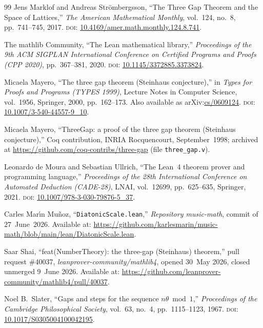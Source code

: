 \documentclass[11pt,reqno]{amsart}
\theoremstyle{plain}
\theoremstyle{definition}
\theoremstyle{remark}
\newcommand{\code}[1]{\texttt{#1}}
\begin{document}
\begin{thebibliography}{99}
Jens Marklof and Andreas Str\"{o}mbergsson,
``The Three Gap Theorem and the Space of Lattices,''
\emph{The American Mathematical Monthly}, vol.~124, no.~8, pp.~741--745,
2017.
\textsc{doi}: \href{https://doi.org/10.4169/amer.math.monthly.124.8.741}%
{10.4169/amer.math.monthly.124.8.741}.

The mathlib Community,
``The Lean mathematical library,''
\emph{Proceedings of the 9th ACM SIGPLAN International Conference on
Certified Programs and Proofs (CPP 2020)},
pp.~367--381, 2020.
\textsc{doi}: \href{https://doi.org/10.1145/3372885.3373824}%
{10.1145/3372885.3373824}.

Micaela Mayero,
``The three gap theorem (Steinhaus conjecture),''
in \emph{Types for Proofs and Programs (TYPES 1999)},
Lecture Notes in Computer Science, vol.~1956, Springer, 2000, pp.~162--173.
Also available as arXiv:\href{https://arxiv.org/abs/cs/0609124}{cs/0609124}.
\textsc{doi}: \href{https://doi.org/10.1007/3-540-44557-9_10}%
{10.1007/3-540-44557-9\_10}.

Micaela Mayero,
``ThreeGap: a proof of the three gap theorem (Steinhaus conjecture),''
Coq contribution, INRIA Rocquencourt, September~1998; archived at
\url{https://github.com/coq-contribs/three-gap} (file \code{three\_gap.v}).

Leonardo de Moura and Sebastian Ullrich,
``The Lean~4 theorem prover and programming language,''
\emph{Proceedings of the 28th International Conference on Automated
Deduction (CADE-28)},
LNAI, vol.~12699, pp.~625--635, Springer, 2021.
\textsc{doi}: \href{https://doi.org/10.1007/978-3-030-79876-5_37}%
{10.1007/978-3-030-79876-5\_37}.

Carles Mar\'{\i}n Mu\~{n}oz,
``\code{DiatonicScale.lean},''
\emph{Repository music-math}, commit of $27$~June~2026.\newline
Available at:
\url{https://github.com/karlesmarin/music-math/blob/main/lean/DiatonicScale.lean}.

Saar Shai,
``feat(NumberTheory): the three-gap (Steinhaus) theorem,''
pull request \#40037, \emph{leanprover-community/mathlib4}, opened 30~May
2026, closed unmerged 9~June 2026.\newline
Available at:
\url{https://github.com/leanprover-community/mathlib4/pull/40037}.

Noel B.\ Slater,
``Gaps and steps for the sequence $n\theta\bmod 1$,''
\emph{Proceedings of the Cambridge Philosophical Society},
vol.~63, no.~4, pp.~1115--1123, 1967.
\textsc{doi}: \href{https://doi.org/10.1017/S0305004100042195}%
{10.1017/S0305004100042195}.


\end{thebibliography}
\end{document}
